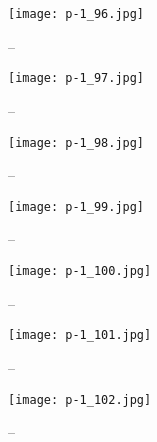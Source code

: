 \clearpage


\begin{figure}
    \begin{center}
        \texttt{[image: p-1\_96.jpg]}
        \caption{--}
    \end{center}
\end{figure}

\clearpage


\begin{figure}
    \begin{center}
        \texttt{[image: p-1\_97.jpg]}
        \caption{--}
    \end{center}
\end{figure}

\clearpage


\begin{figure}
    \begin{center}
        \texttt{[image: p-1\_98.jpg]}
        \caption{--}
    \end{center}
\end{figure}

\clearpage


\begin{figure}
    \begin{center}
        \texttt{[image: p-1\_99.jpg]}
        \caption{--}
    \end{center}
\end{figure}

\clearpage


\begin{figure}
    \begin{center}
        \texttt{[image: p-1\_100.jpg]}
        \caption{--}
    \end{center}
\end{figure}

\clearpage


\begin{figure}
    \begin{center}
        \texttt{[image: p-1\_101.jpg]}
        \caption{--}
    \end{center}
\end{figure}

\clearpage


\begin{figure}
    \begin{center}
        \texttt{[image: p-1\_102.jpg]}
        \caption{--}
    \end{center}
\end{figure}

\clearpage

